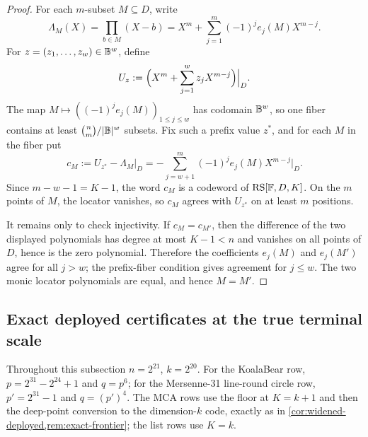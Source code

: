 \begin{proof}
For each $m$-subset $M\subseteq D$, write
\[
        \Lambda_M(X)=\prod_{b\in M}(X-b)
        =X^m+\sum_{j=1}^{m}(-1)^j e_j(M)X^{m-j}.
\]
For $z=(z_1,\ldots,z_w)\in\mathbb B^w$, define
\[
        U_z:=\Bigl(X^m+\sum_{j=1}^{w}z_jX^{m-j}\Bigr)\Big|_D.
\]
The map $M\mapsto((-1)^je_j(M))_{1\le j\le w}$ has codomain $\mathbb B^w$, so one fiber contains at least $\binom nm/|\mathbb B|^w$ subsets.  Fix such a prefix value $z^*$, and for each $M$ in the fiber put
\[
        c_M:=U_{z^*}-\Lambda_M|_D
        =-\sum_{j=w+1}^{m}(-1)^je_j(M)X^{m-j}\Big|_D.
\]
Since $m-w-1=K-1$, the word $c_M$ is a codeword of $\mathrm{RS}[\mathbb F,D,K]$.  On the $m$ points of $M$, the locator vanishes, so $c_M$ agrees with $U_{z^*}$ on at least $m$ positions.

It remains only to check injectivity.  If $c_M=c_{M'}$, then the difference of the two displayed polynomials has degree at most $K-1<n$ and vanishes on all points of $D$, hence is the zero polynomial.  Therefore the coefficients $e_j(M)$ and $e_j(M')$ agree for all $j>w$; the prefix-fiber condition gives agreement for $j\le w$.  The two monic locator polynomials are equal, and hence $M=M'$.
\end{proof}

\subsection{Exact deployed certificates at the true terminal scale}

Throughout this subsection $n=2^{21}$, $k=2^{20}$.  For the KoalaBear row, $p=2^{31}-2^{24}+1$ and $q=p^6$; for the Mersenne-31 line-round circle row, $p'=2^{31}-1$ and $q=(p')^4$.  The MCA rows use the floor at $K=k+1$ and then the deep-point conversion to the dimension-$k$ code, exactly as in \cref{cor:widened-deployed,rem:exact-frontier}; the list rows use $K=k$.

